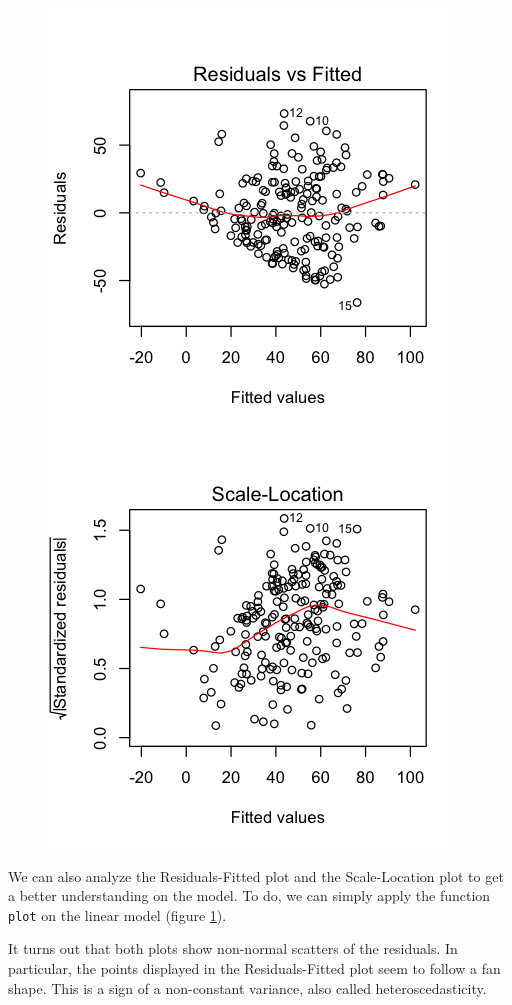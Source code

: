 \documentclass[]{report}
\begin{document}
\begin{figure}[!hb]
	\centering
	\includegraphics{Figures/fitted_value_plots}
	\caption{}
	\label{fig:fitted_value_plots}
\end{figure}

We can also analyze the Residuals-Fitted plot and the Scale-Location plot to get a better understanding on the model. To do, we can simply apply the function \texttt{plot} on the linear model (figure \ref{fig:fitted_value_plots}).

It turns out that both plots show non-normal scatters of the residuals. In particular, the points displayed in the Residuals-Fitted plot seem to follow a fan shape. This is a sign of a non-constant variance, also called heteroscedasticity.
\end{document}
